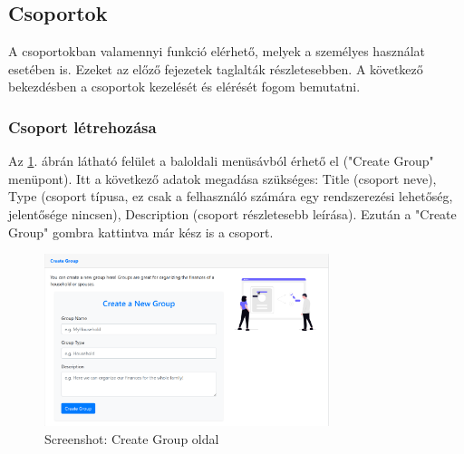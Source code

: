 \subsection{Csoportok}
A csoportokban valamennyi funkció elérhető, melyek a személyes használat esetében is. Ezeket az előző fejezetek taglalták részletesebben. A következő bekezdésben a csoportok kezelését és elérését fogom bemutatni.
\subsubsection{Csoport létrehozása}
Az \ref{fig:create-group}. ábrán látható felület a baloldali menüsávból érhető el ("Create Group" menüpont). Itt a következő adatok megadása szükséges: Title (csoport neve), Type (csoport típusa, ez csak a felhasználó számára egy rendszerezési lehetőség, jelentősége nincsen), Description (csoport részletesebb leírása). Ezután a "Create Group" gombra kattintva már kész is a csoport.
\begin{figure}[H]
	\centering
	\includegraphics[height=190px]{img/create-group}
	\caption{Screenshot: Create Group oldal}
	\label{fig:create-group}
\end{figure}

